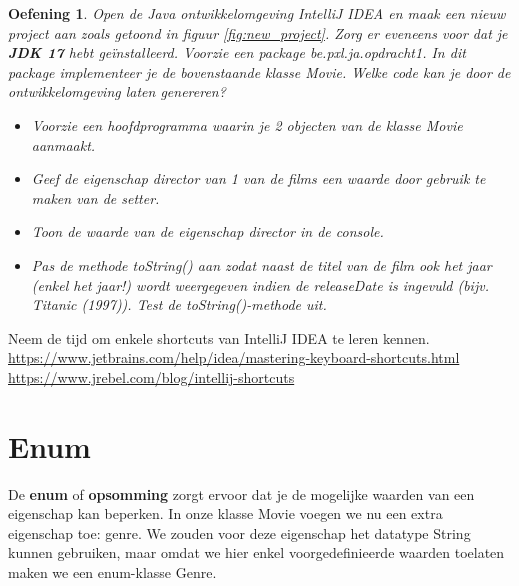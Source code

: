 \documentclass{tstextbook}
\newtheorem{envoefening}{Oefening}[chapter]
\newenvironment{oefening}
               {\begin{boxexercise}\begin{envoefening}}
               {\end{envoefening}\end{boxexercise}}
\begin{document}
\begin{oefening}
Open de Java ontwikkelomgeving IntelliJ IDEA en maak een nieuw project aan zoals getoond in figuur \ref{fig:new_project}. Zorg er eveneens voor dat je \textbf{JDK 17} hebt ge\"installeerd. 
Voorzie een package be.pxl.ja.opdracht1. In dit package implementeer je de bovenstaande klasse Movie. Welke code kan je door de ontwikkelomgeving laten genereren?
\begin{itemize}
\item Voorzie een hoofdprogramma waarin je 2 objecten van de klasse Movie aanmaakt.
\item Geef de eigenschap director van 1 van de films een waarde door gebruik te maken van de setter.
\item Toon de waarde van de eigenschap director in de console.
\item Pas de methode \emph{toString()} aan zodat naast de titel van de film ook het jaar (enkel het jaar!) wordt weergegeven indien de releaseDate is ingevuld (bijv. Titanic (1997)). Test de toString()-methode uit.
\end{itemize} 
\end{oefening}

\begin{remark}
Neem de tijd om enkele shortcuts van IntelliJ IDEA te leren kennen.\\
\url{https://www.jetbrains.com/help/idea/mastering-keyboard-shortcuts.html}\\
\url{https://www.jrebel.com/blog/intellij-shortcuts}
\end{remark}

\section{Enum}

De \textbf{enum} of \textbf{opsomming} zorgt ervoor dat je de mogelijke waarden van een eigenschap kan beperken.
In onze klasse Movie voegen we nu een extra eigenschap toe: genre. 
We zouden voor deze eigenschap het datatype String kunnen gebruiken,  maar omdat we hier enkel voorgedefinieerde waarden toelaten maken we een enum-klasse Genre.
\end{document}
